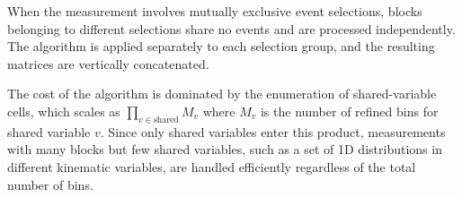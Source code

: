 \documentclass[a4paper,11pt]{article}
\begin{document}
When the measurement involves mutually exclusive event selections, blocks belonging to different selections share no events and are processed independently. The algorithm is applied separately to each selection group, and the resulting matrices are vertically concatenated.

The cost of the algorithm is dominated by the enumeration of shared-variable cells, which scales as $\prod_{v \in \text{shared}} M_v$ where $M_v$ is the number of refined bins for shared variable $v$. Since only shared variables enter this product, measurements with many blocks but few shared variables, such as a set of 1D distributions in different kinematic variables, are handled efficiently regardless of the total number of bins.




\end{document}
